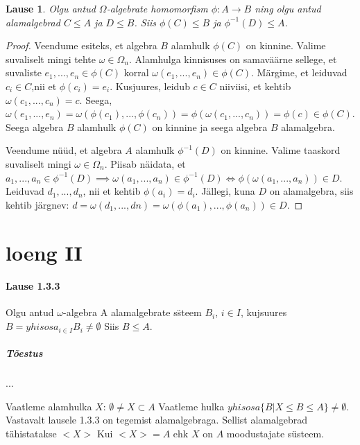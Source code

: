 \documentclass[12pt]{report}
\numberwithin{equation}{section}
\theoremstyle{definition}
\theoremstyle{plain}
\newtheorem{homomorfism_ja_alamalgebrad}[equation]{Lause}
\begin{document}
\begin{homomorfism_ja_alamalgebrad}
Olgu antud $\Omega$-algebrate homomorfism $\phi : A \to B$ ning olgu antud alamalgebrad $C \leq A$ ja $D \leq B$. Siis $\phi(C) \leq B$ ja $\phi^{-1}(D) \leq A$. 
\end{homomorfism_ja_alamalgebrad}

\begin{proof}
Veendume esiteks, et algebra $B$ alamhulk $\phi(C)$ on kinnine. Valime suvaliselt mingi  tehte $\omega \in \Omega_n$. Alamhulga kinnisuses on samaväärne sellege, et suvaliste $ e_1,...,e_n \in \phi(C)$ korral $\omega(e_1,...,e_n) \in \phi(C)$. Märgime, et leiduvad $ c_i \in C$,nii et $\phi(c_i)=e_i$. Kusjuures, leidub $ c \in C$ niiviisi, et kehtib $ \omega(c_1,...,c_n) = c$. Seega, $ \omega(e_1,...,e_n) = \omega(\phi(c_1),...,\phi(c_n))= \phi(\omega(c_1,...,c_n)) = \phi(c) \in \phi(C)$. Seega algebra $B$ alamhulk $\phi(C)$ on kinnine ja seega algebra $B$ alamalgebra. 

Veendume n\"u\"ud, et algebra $A$ alamhulk $\phi^{-1}(D)$ on kinnine. Valime taaskord suvaliselt mingi $\omega \in \Omega_n$. Piisab näidata, et $a_1,...,a_n \in \phi^{-1}(D) \implies \omega(a_1,...,a_n) \in \phi^{-1}(D) \iff \phi(\omega(a_1,...,a_n)) \in D$. Leiduvad $d_1,...,d_n$, nii et kehtib $\phi(a_i)=d_i$. Jällegi, kuna $D$ on alamalgebra, siis kehtib järgnev: $d = \omega(d_1,...,dn) = \omega(\phi(a_1),...,\phi(a_n)) \in D$.
 


\end{proof}


 
 
\section{loeng II}

\paragraph{Lause 1.3.3} Olgu antud $\omega$-algebra A alamalgebrate s\"steem $B_i$, $i \in I$, kujsuures $B= yhisosa_{i \in I} B_i \neq \emptyset$ Siis $B \leq A$.

\subparagraph*{Tõestus}

...

Vaatleme alamhulka $X$:
$\emptyset \neq X \subset A$
Vaatleme hulka $yhisosa \{ B | X \leq B \leq A \} \neq \emptyset$. Vastavalt lausele 1.3.3 on tegemist alamalgebraga. Sellist alamalgebrad tähistatakse $<X>$
Kui $<X> = A$ ehk $X$ on $A$ moodustajate s\"usteem.
\end{document}
